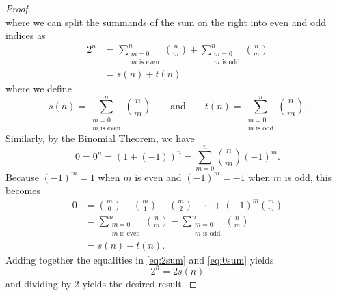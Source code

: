 \documentclass[11pt]{article}
\begin{document}
\begin{enumerate}
\begin{Solution}
\begin{proof}
\[ \]
where we can split the summands of the sum on the right into even and odd indices as
\begin{align*}\tag{$\ast$}\label{eq:2sum}
 2^n &= \sum_{\substack{m=0\\m\text{ is even}}}^n\binom{n}{m} + \sum_{\substack{m=0\\m\text{ is odd}}}^n\binom{n}{m}\\
  & = s(n) + t(n)
\end{align*}
where we define 
\[
 s(n) = \sum_{\substack{m=0\\m\text{ is even}}}^n \binom{n}{m} \qquad\text{and}\qquad t(n) = \sum_{\substack{m=0\\m\text{ is odd}}}^n \binom{n}{m}.
\]
Similarly, by the Binomial Theorem, we have 
 \[
  0 = 0^n = (1+(-1))^n = \sum_{m=0}^n \binom{n}{m} (-1)^m.
 \]
Because $(-1)^m=1$ when $m$ is even and $(-1)^m=-1$ when $m$ is odd, this becomes
\begin{align*}
 0 &= \binom{m}{0} - \binom{m}{1} + \binom{m}{2} - \cdots +(-1)^m\binom{m}{m}\\
  & =\sum_{\substack{m=0\\m\text{ is even}}}^n\binom{n}{m} - \sum_{\substack{m=0\\m\text{ is odd}}}^n\binom{n}{m}\tag{$\ast\ast$}\label{eq:0sum}\\
  & = s(n) - t(n).
\end{align*}
Adding together the equalities in \eqref{eq:2sum} and \eqref{eq:0sum} yields
\[
 2^n = 2s(n)
\]
and dividing by 2 yields the desired result.
\end{proof}
\end{Solution}




\end{enumerate}
\end{document}
